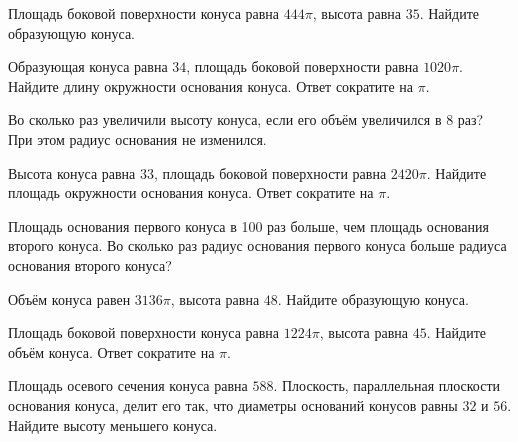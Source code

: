 \documentclass[a4paper]{article}
\begin{document}
\begin{taskBN}{54}
Площадь боковой поверхности конуса равна $444\pi$, высота равна $35$. Найдите образующую конуса. 
\end{taskBN}

\begin{taskBN}{55}
Образующая конуса равна $34$, площадь боковой поверхности равна $1020\pi$. Найдите длину окружности основания конуса. Ответ сократите на $\pi$.
\end{taskBN}

\begin{taskBN}{56}
Во сколько раз увеличили высоту конуса, если его объём увеличился в 8 раз? При этом радиус основания не изменился.
\end{taskBN}

\begin{taskBN}{57}
Высота конуса равна $33$, площадь боковой поверхности равна $2420\pi$. Найдите площадь окружности основания конуса. Ответ сократите на $\pi$.
\end{taskBN}

\begin{taskBN}{58}
Площадь основания первого конуса в 100 раз больше, чем площадь основания второго конуса. Во сколько раз радиус основания первого конуса больше радиуса основания второго конуса?
\end{taskBN}

\begin{taskBN}{59}
Объём конуса равен $3136\pi$, высота равна $48$. Найдите образующую конуса. 
\end{taskBN}

\begin{taskBN}{60}
Площадь боковой поверхности конуса равна $1224\pi$, высота равна $45$. Найдите объём конуса. Ответ сократите на $\pi$.
\end{taskBN}

\begin{taskBN}{61}
Площадь осевого сечения конуса равна $588$. Плоскость, параллельная плоскости основания конуса,  делит его так, что диаметры оснований конусов равны $32$ и $56$. Найдите высоту меньшего конуса. 
\end{taskBN}
\end{document}
